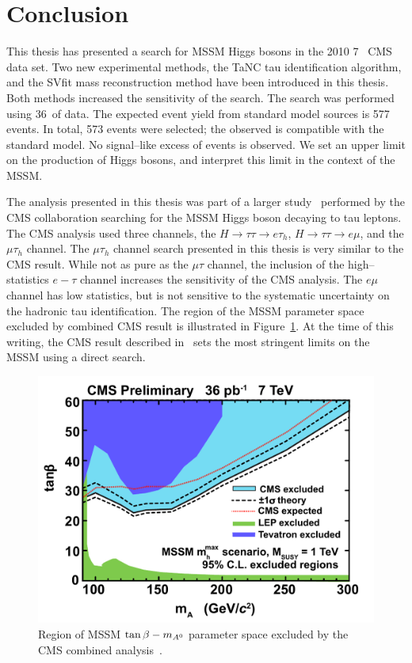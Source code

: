 \ifx\master\undefined\fi
%
\chapter*{Conclusion}
\label{ch:conclusions}

This thesis has presented a search for MSSM Higgs bosons in the 2010 7~\TeV
CMS data set. Two new experimental methods, the TaNC tau identification
algorithm, and the SVfit mass reconstruction method have been introduced in this
thesis.  Both methods increased the sensitivity of the search.  The search
was performed using 36~\pbinv of data.  The expected event yield from standard
model sources is 577 events. In total, 573 events were selected; the observed is
compatible with the standard model.  No signal--like excess of events is
observed.  We set an upper limit on the production of Higgs bosons, and
interpret this limit in the context of the MSSM.

The analysis presented in this thesis was part of a larger
study~\cite{HIG-10-002} performed by the CMS collaboration searching for the
MSSM Higgs boson decaying to tau leptons.  The CMS analysis used three channels,
the $H \to \tau \tau \to e\tau_h$, $H \to \tau \tau \to e\mu$, and the
$\mu\tau_h$ channel.  The $\mu\tau_h$ channel search presented in this thesis
is very similar to the CMS result.  While not as pure as the $\mu\tau$ channel,
the inclusion of the high--statistics $e-\tau$ channel increases the sensitivity
of the CMS analysis.  The $e\mu$ channel has low statistics, but is not
sensitive to the systematic uncertainty on the hadronic tau identification.  The
region of the MSSM parameter space excluded by combined CMS result is
illustrated in Figure~\ref{fig:CMSTanBetaExclusionWTF}.  At the time of this
writing, the CMS result described in~\cite{HIG-10-002} sets the most stringent
limits on the MSSM using a direct search.  
%
\begin{figure}[htb]
  \centering
  \includegraphics[width=\textwidth]{conclusions_chapter/figures/tanbeta-ma-LEP-Tev.pdf}
  \caption[CMS combined exclusion of MSSM $\tb-\ma$ parameter space]{Region of MSSM
  $\tb-\ma$ parameter space excluded by the CMS combined
  analysis~\cite{HIG-10-002}.}
  \label{fig:CMSTanBetaExclusionWTF} 
\end{figure}

\ifx\master\undefined\fi
